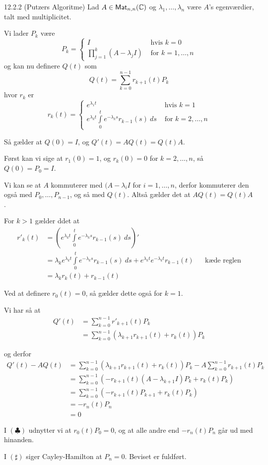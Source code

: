 \begin{saetning}{12.2.2 (Putzers Algoritme)}
	Lad $A\in \textsf{Mat}_{n,n}(\mathbb{C})$ og $\lambda_1, \dotsc, \lambda_n$ være
	$A$'s egenværdier, talt med multiplicitet.

	Vi lader $P_k$ være
	\[
		P_k = \begin{cases}
			I & \text{ hvis } k= 0\\
			\prod_{j=1}^k(A-\lambda_jI) & \text{ for } k = 1, \dotsc, n
		\end{cases}
	\]
	og kan nu definere $Q(t)$ som
	\[
		Q(t) = \sum_{k=0}^{n-1}r_{k+1}(t)P_k
	\]
	hvor $r_k$ er
	\[
		r_k(t) =
		\begin{cases}
			e^{\lambda_1t} & \text{ hvis } k = 1\\
			e^{\lambda_kt}\int\limits_0^te^{-\lambda_ks}r_{k-1}(s) \:ds & \text{ for }
			k = 2, \dotsc, n
		\end{cases}
	\]

	Så gælder at $Q(0) = I$, og $Q'(t) = AQ(t) = Q(t)A$.
\end{saetning}

\begin{bevis}
	Først kan vi sige at $r_1(0) = 1$, og $r_k(0) = 0$ for $k = 2, \dotsc, n$,
	så $Q(0) = P_0 = I$.

	Vi kan se at $A$ kommuterer med $(A - \lambda_iI$ for $i = 1, \dotsc, n$,
	derfor kommuterer den også med $P_0, \dotsc, P_{n-1}$, og så med $Q(t)$.
	Altså gælder det at $AQ(t) = Q(t)A$.

	For $k > 1$ gælder ddet at
	\begin{align*}
		r'_k(t) &= (e^{\lambda_kt}\int\limits_0^te^{-\lambda_ks}r_{k-1}(s) \:ds)'\\
		&= \lambda_ke^{\lambda_kt}\int\limits_0^te^{-\lambda_ks}r_{k-1}(s)\:ds
		+ e^{\lambda_kt}e^{-\lambda_kt}r_{k-1}(t) && \text{kæde reglen}\\
		&= \lambda_kr_k(t) + r_{k-1}(t)
	\end{align*}

	Ved at definere $r_0(t) = 0$, så gælder dette også for $k = 1$.

	Vi har så at
	\begin{align*}
		Q'(t) &= \sum_{k=0}^{n-1}r'_{k+1}(t)P_k\\
		&= \sum_{k=0}^{n-1}(\lambda_{k+1}r_{k+1}(t) + r_k(t))P_k
	\end{align*}

	og derfor
	\begin{align*}
		Q'(t) - AQ(t) &= \sum_{k=0}^{n-1}(\lambda_{k+1}r_{k+1}(t) + r_k(t))P_k
		- A\sum_{k=0}^{n-1} r_{k+1}(t)P_k\\
		&= \sum_{k=0}^{n-1} (-r_{k+1}(t)(A - \lambda_{k+1}I)P_k + r_k(t)P_k)\\
		&= \sum_{k=0}^{n-1} (-r_{k+1}(t)P_{k+1}+r_k(t)P_k) \tag{$\clubsuit$}\\
		&= -r_n(t)P_n \tag{$\sharp$}\\
		&= 0
	\end{align*}

	I $(\clubsuit)$ udnytter vi at $r_0(t)P_0 = 0$, og at alle andre end 
	$-r_n(t)P_n$ går ud med hinanden.

	I $(\sharp)$ siger Cayley-Hamilton at $P_n = 0$. Beviset er fuldført.
\end{bevis}

